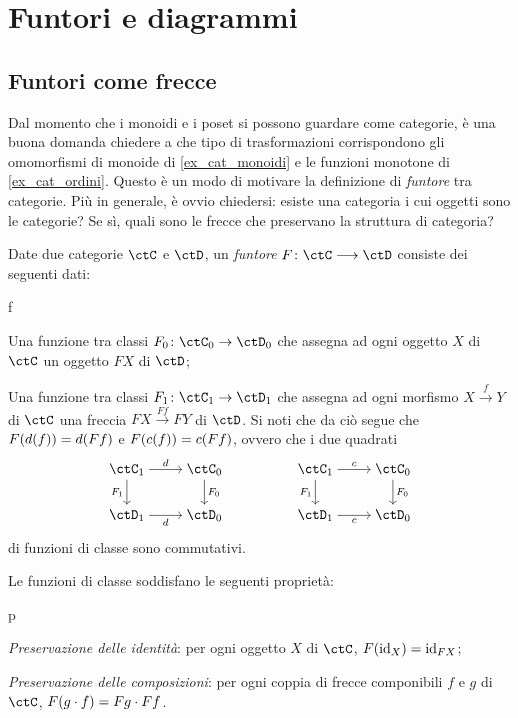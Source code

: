 \section{Funtori e diagrammi}\label{sec_funtori}
\subsection{Funtori come frecce}
Dal momento che i monoidi e i poset si possono guardare come categorie, è una buona domanda chiedere a che tipo di trasformazioni corrispondono gli omomorfismi di monoide di \ref{ex_cat_monoidi} e le funzioni monotone di \ref{ex_cat_ordini}. Questo è un modo di motivare la definizione di \emph{funtore} tra categorie. Più in generale, è ovvio chiedersi: esiste una categoria i cui oggetti sono le categorie? Se sì, quali sono le frecce che preservano la struttura di categoria?
\begin{definition}[Funtore]\label{def_funtore}
 Date due categorie \(\ctC\) e \(\ctD\), un \emph{funtore} \(F\colon\ctC\fun\ctD\) consiste dei seguenti dati:
 \begin{enumtag}{f}
  \item \label{f_1} Una funzione tra classi \(F_0 \colon \ctC_0\to\ctD_0\) che assegna ad ogni oggetto \(X\) di \(\ctC\) un oggetto \(FX\) di \(\ctD\);
  \item \label{f_2} Una funzione tra classi \(F_1 \colon \ctC_1\to\ctD_1\) che assegna ad ogni morfismo \(X \xrightarrow{f} Y\) di \(\ctC\) una freccia \(FX \xrightarrow{Ff} FY\) di \(\ctD\). Si noti che da ciò segue che \(F(d(f))=d(Ff)\) e \(F(c(f))=c(Ff)\), ovvero che i due quadrati
  \[\begin{tikzcd}[cramped]
    {\ctC_1} & {\ctC_0} && {\ctC_1} & {\ctC_0} \\
    {\ctD_1} & {\ctD_0} && {\ctD_1} & {\ctD_0}
    \arrow["d", from=1-1, to=1-2]
    \arrow["{{F_1}}"', from=1-1, to=2-1]
    \arrow["{{F_0}}", from=1-2, to=2-2]
    \arrow["c", from=1-4, to=1-5]
    \arrow["{F_1}"', from=1-4, to=2-4]
    \arrow["{F_0}", from=1-5, to=2-5]
    \arrow["d"', from=2-1, to=2-2]
    \arrow["c"', from=2-4, to=2-5]
   \end{tikzcd}\]
  di funzioni di classe sono commutativi.
 \end{enumtag}
 Le funzioni di classe soddisfano le seguenti proprietà:
 \begin{enumtag}{p}
  \item \label{p_1} \emph{Preservazione delle identità}: per ogni oggetto \(X\) di \(\ctC\), \(F(\mathrm{id}_X)=\mathrm{id}_{FX}\);
  \item \label{p_2} \emph{Preservazione delle composizioni}: per ogni coppia di frecce componibili \(f\) e \(g\) di \(\ctC\), \(F(g\cdot f)=Fg\cdot Ff\).
 \end{enumtag}
\end{definition}
